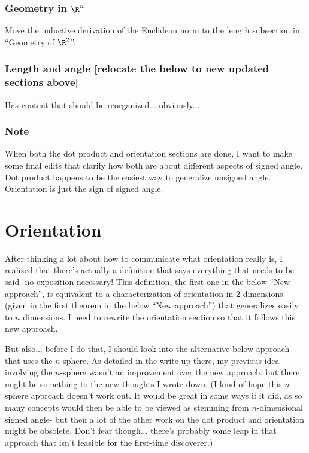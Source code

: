 \subsubsection*{Geometry in $\R^n$}

Move the inductive derivation of the Euclidean norm to the length subsection in ``Geometry of $\R^2$''.

\subsubsection*{Length and angle [relocate the below to new updated sections above]}

Has content that should be reorganized... obviously...

\subsubsection*{Note}

When both the dot product and orientation sections are done, I want to make some final edits that clarify how both are about different aspects of signed angle. Dot product happens to be the easiest way to generalize unsigned angle. Orientation is just the sign of signed angle.

\newpage

\section*{Orientation}

After thinking a lot about how to communicate what orientation really is, I realized that there's actually a definition that says everything that needs to be said- no exposition necessary! This definition, the first one in the below ``New approach'', is equivalent to a characterization of orientation in $2$ dimensions (given in the first theorem in the below ``New approach'') that generalizes easily to $n$ dimensions. I need to rewrite the orientation section so that it follows this new approach.

But also... before I do that, I should look into the alternative below approach that uses the $n$-sphere. As detailed in the write-up there, my previous idea involving the $n$-sphere wasn't an improvement over the new approach, but there might be something to the new thoughts I wrote down. (I kind of hope this $n$-sphere approach doesn't work out. It would be great in some ways if it did, as so many concepts would then be able to be viewed as stemming from $n$-dimensional signed angle- but then a lot of the other work on the dot product and orientation might be obsolete. Don't fear though... there's probably some leap in that approach that isn't feasible for the first-time discoverer.)


